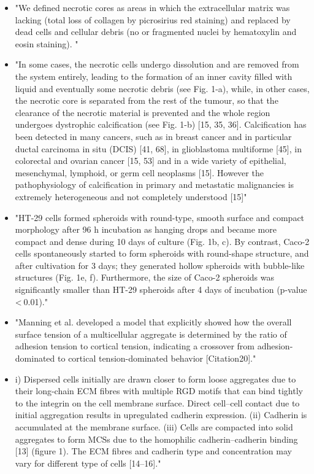 \documentclass[11pt,a4paper]{article}
\begin{document}
\begin{itemize}
\item "We defined necrotic cores as areas in which the extracellular matrix was lacking (total loss of collagen by picrosirius red staining) and replaced by dead cells and cellular debris (no or fragmented nuclei by hematoxylin and
eosin staining). "\cite{Thim2010}
\item "In some cases, the necrotic cells undergo dissolution
and are removed from the system entirely, leading to the formation of an inner cavity filled with liquid and
eventually some necrotic debris (see Fig. 1-a), while, in other cases, the necrotic core is separated from the
rest of the tumour, so that the clearance of the necrotic material is prevented and the whole region undergoes
dystrophic calcification (see Fig. 1-b) [15, 35, 36]. Calcification has been detected in many cancers, such as
in breast cancer and in particular ductal carcinoma in situ (DCIS) [41, 68], in glioblastoma multiforme [45],
in colorectal and ovarian cancer [15, 53] and in a wide variety of epithelial, mesenchymal, lymphoid, or germ
cell neoplasms [15]. However the pathophysiology of calcification in primary and metastatic malignancies is
extremely heterogeneous and not completely understood [15]"\cite{Giverso2018}
\item "HT-29 cells formed spheroids with round-type, smooth surface and compact morphology after 96 h incubation as hanging drops and became more compact and dense during 10 days of culture (Fig. 1b, c). By contrast, Caco-2 cells spontaneously started to form spheroids with round-shape structure, and after cultivation for 3 days; they generated hollow spheroids with bubble-like structures (Fig. 1e, f). Furthermore, the size of Caco-2 spheroids was significantly smaller than HT-29 spheroids after 4 days of incubation (p-value < 0.01)."\cite{Gheytanchi2021}
\item "Manning et al. developed a model that explicitly showed how the overall surface tension of a multicellular aggregate is determined by the ratio of adhesion tension to cortical tension, indicating a crossover from adhesion-dominated to cortical tension-dominated behavior [Citation20]."\cite{Boot2021}
\item i) Dispersed cells initially are drawn closer to form loose aggregates due to their long-chain ECM fibres with multiple RGD motifs that can bind tightly to the integrin on the cell membrane surface. Direct cell–cell contact due to initial aggregation results in upregulated cadherin expression. (ii) Cadherin is accumulated at the membrane surface. (iii) Cells are compacted into solid aggregates to form MCSs due to the homophilic cadherin–cadherin binding [13] (figure 1). The ECM fibres and cadherin type and concentration may vary for different type of cells [14–16]."\cite{Cui2017}
\end{itemize}
\end{document}

